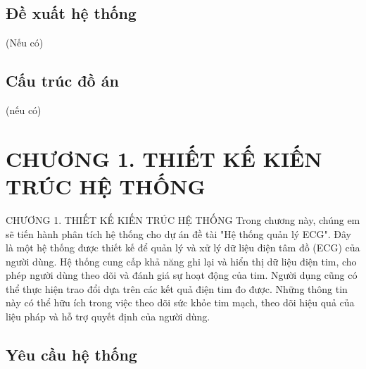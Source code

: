 \documentclass{article}%
\begin{document}
\subsection*{Đề xuất hệ thống}
(Nếu có) \cite{nhu2019effects}

\subsection*{Cấu trúc đồ án}
(nếu có)
\cleardoublepage


\section*{CHƯƠNG 1. THIẾT KẾ KIẾN TRÚC HỆ THỐNG }
\setcounter{section}{1}
\setcounter{subsection}{0} %
\setcounter{table}{0} %
\setcounter{figure}{0} %
{\numberline{}CHƯƠNG 1. THIẾT KẾ KIẾN TRÚC HỆ THỐNG}
Trong chương này, chúng em sẽ tiến hành phân tích hệ thống cho dự án đề tài "Hệ thống quản lý ECG". 
Đây là một hệ thống được thiết kế để quản lý và xử lý dữ liệu điện tâm đồ (ECG) của người dùng. 
Hệ thống cung cấp khả năng ghi lại và hiển thị dữ liệu điện tim, cho phép người dùng theo dõi và 
đánh giá sự hoạt động của tim. 
Người dụng cũng có thể thực hiện trao đổi dựa trên các kết quả điện tim đo được. 
Những thông tin này có thể hữu ích trong việc theo dõi sức khỏe tim mạch, theo dõi hiệu quả của liệu pháp 
và hỗ trợ quyết định của người dùng.



\subsection{Yêu cầu hệ thống}
\end{document}
